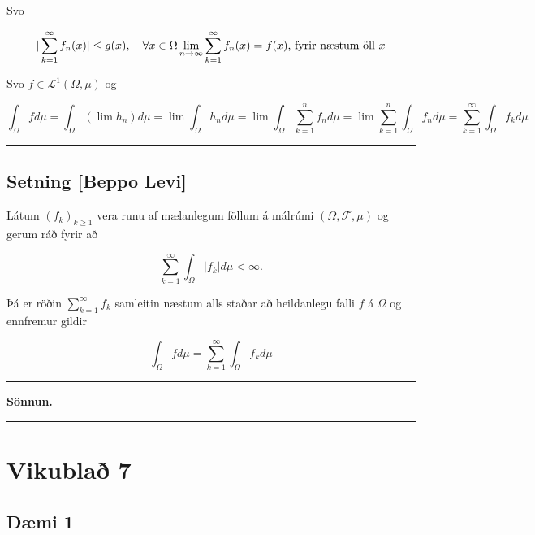 \documentclass[]{book}
\begin{document}
Svo

\[
|\sum_{k=1}^\infty f_n(x)| \leq g(x), \quad \forall x\in\Omega \\
\lim_{n\rightarrow\infty}\sum_{k=1}^\infty f_n(x) = f(x) \text{, fyrir næstum öll }x
\]

Svo \(f\in\mathcal L^1(\Omega,\mu)\) og

\[
\int_\Omega fd\mu = \int_\Omega (\lim h_n)d\mu = \lim\int_\Omega h_nd\mu = \lim\int_\Omega \sum_{k=1}^n f_nd\mu = \lim\sum_{k=1}^n\int_\Omega f_nd\mu = \sum_{k=1}^\infty\int_\Omega f_kd\mu
\]

\begin{center}\rule{0.5\linewidth}{\linethickness}\end{center}

\hypertarget{setning-beppo-levi}{%
\section{Setning {[}Beppo Levi{]}}\label{setning-beppo-levi}}

Látum \((f_k)_{k\geq 1}\) vera runu af mælanlegum föllum á málrúmi \((\Omega,\mathcal F,\mu)\) og gerum ráð fyrir að

\[
\sum_{k=1}^\infty\int_\Omega |f_k|d\mu < \infty.
\]

Þá er röðin \(\sum_{k=1}^\infty f_k\) samleitin næstum alls staðar að heildanlegu falli \(f\) á \(\Omega\) og ennfremur gildir

\[
\int_\Omega fd\mu = \sum_{k=1}^\infty \int_\Omega f_kd\mu
\]

\begin{center}\rule{0.5\linewidth}{\linethickness}\end{center}

\textbf{Sönnun.}

\begin{center}\rule{0.5\linewidth}{\linethickness}\end{center}

\hypertarget{vikubla-7}{%
\chapter*{Vikublað 7}\label{vikubla-7}}

\hypertarget{dmi-1-4}{%
\section*{Dæmi 1}\label{dmi-1-4}}
\end{document}
